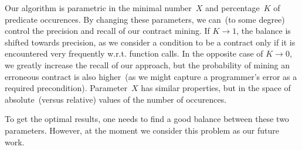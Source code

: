 Our algorithm is parametric in the minimal number~$X$ and percentage~$K$ of predicate occurences. By changing these parameters, we can~(to some degree) control the precision and recall of our contract mining. If $K \rightarrow 1$, the balance is shifted towards precision, as we consider a condition to be a contract only if it is encountered very frequently w.r.t. function calls. In the opposite case of $K \rightarrow 0$, we greatly increase the recall of our approach, but the probability of mining an erroneous contract is also higher~(as we might capture a programmer's error as a required precondition). Parameter~$X$ has similar properties, but in the space of absolute~(versus relative) values of the number of occurences.

To get the optimal results, one needs to find a good balance between these two parameters. However, at the moment we consider this problem as our future work.
